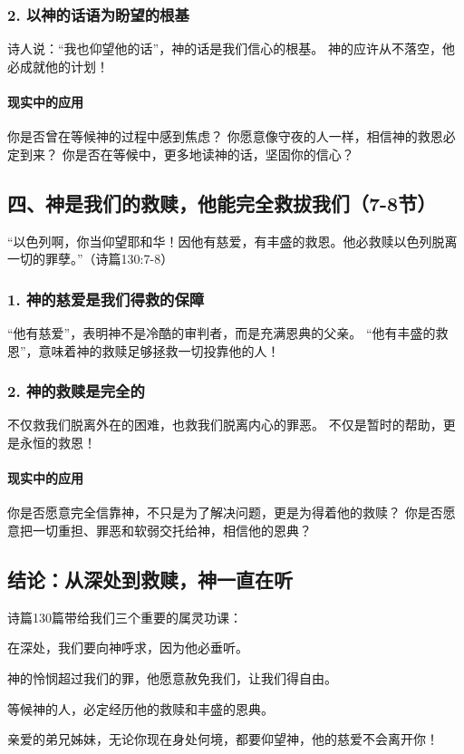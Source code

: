 \documentclass[a4paper, 12pt]{article}
\begin{document}
\subsubsection*{2. 以神的话语为盼望的根基}
诗人说：“我也仰望他的话”，神的话是我们信心的根基。
神的应许从不落空，他必成就他的计划！
\paragraph*{现实中的应用}

你是否曾在等候神的过程中感到焦虑？
你愿意像守夜的人一样，相信神的救恩必定到来？
你是否在等候中，更多地读神的话，坚固你的信心？
\subsection*{四、神是我们的救赎，他能完全救拔我们（7-8节）}
“以色列啊，你当仰望耶和华！因他有慈爱，有丰盛的救恩。他必救赎以色列脱离一切的罪孽。”（诗篇130:7-8）

\subsubsection*{1. 神的慈爱是我们得救的保障}
“他有慈爱”，表明神不是冷酷的审判者，而是充满恩典的父亲。
“他有丰盛的救恩”，意味着神的救赎足够拯救一切投靠他的人！
\subsubsection*{2. 神的救赎是完全的}
不仅救我们脱离外在的困难，也救我们脱离内心的罪恶。
不仅是暂时的帮助，更是永恒的救恩！
\paragraph*{现实中的应用}

你是否愿意完全信靠神，不只是为了解决问题，更是为得着他的救赎？
你是否愿意把一切重担、罪恶和软弱交托给神，相信他的恩典？
\subsection*{结论：从深处到救赎，神一直在听}
诗篇130篇带给我们三个重要的属灵功课：

在深处，我们要向神呼求，因为他必垂听。

神的怜悯超过我们的罪，他愿意赦免我们，让我们得自由。

等候神的人，必定经历他的救赎和丰盛的恩典。

亲爱的弟兄姊妹，无论你现在身处何境，都要仰望神，他的慈爱不会离开你！
\end{document}
